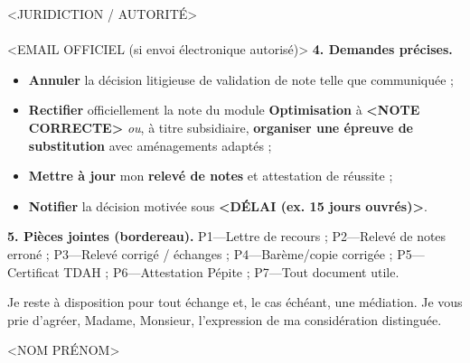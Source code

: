 \documentclass[11pt]{scrlttr2}
\begin{document}
\begin{letter}{<JURIDICTION / AUTORITÉ>\\<ADRESSE OFFICIELLE>\\<EMAIL OFFICIEL (si envoi électronique autorisé)>}
\vspace{0.5em}
\textbf{4. Demandes précises.}
\begin{itemize}
  \item \textbf{Annuler} la décision litigieuse de validation de note telle que communiquée ;
  \item \textbf{Rectifier} officiellement la note du module \textbf{Optimisation} à \textbf{<NOTE CORRECTE>} \textit{ou}, à titre subsidiaire, \textbf{organiser une épreuve de substitution} avec aménagements adaptés ;
  \item \textbf{Mettre à jour} mon \textbf{relevé de notes} et attestation de réussite ; 
  \item \textbf{Notifier} la décision motivée sous \textbf{<DÉLAI (ex. 15 jours ouvrés)>}.
\end{itemize}

\vspace{0.5em}
\textbf{5. Pièces jointes (bordereau).}
P1—Lettre de recours ; P2—Relevé de notes erroné ; P3—Relevé corrigé / échanges ; P4—Barème/copie corrigée ; P5—Certificat TDAH ; P6—Attestation Pépite ; P7—Tout document utile.

\vspace{0.5em}
Je reste à disposition pour tout échange et, le cas échéant, une médiation. Je vous prie d’agréer, Madame, Monsieur, l'expression de ma considération distinguée.

\closing{<NOM PRÉNOM>}
\end{letter}
\end{document}
